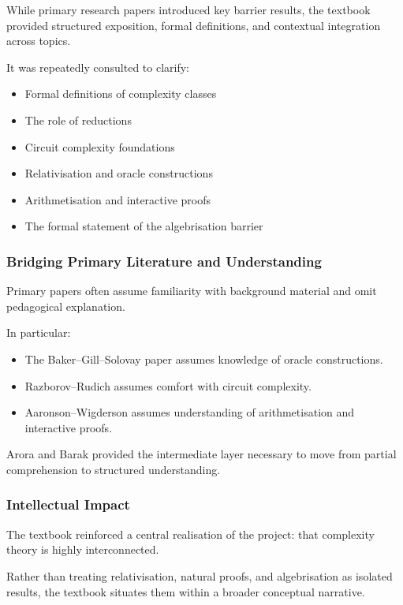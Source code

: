 \documentclass[12pt]{article}
\begin{document}
While primary research papers introduced key barrier results, the textbook provided structured exposition, formal definitions, and contextual integration across topics.

It was repeatedly consulted to clarify:

\begin{itemize}
\item Formal definitions of complexity classes
\item The role of reductions
\item Circuit complexity foundations
\item Relativisation and oracle constructions
\item Arithmetisation and interactive proofs
\item The formal statement of the algebrisation barrier
\end{itemize}

\subsubsection*{Bridging Primary Literature and Understanding}

Primary papers often assume familiarity with background material and omit pedagogical explanation.

In particular:

\begin{itemize}
\item The Baker–Gill–Solovay paper assumes knowledge of oracle constructions.
\item Razborov–Rudich assumes comfort with circuit complexity.
\item Aaronson–Wigderson assumes understanding of arithmetisation and interactive proofs.
\end{itemize}

Arora and Barak provided the intermediate layer necessary to move from partial comprehension to structured understanding.

\subsubsection*{Intellectual Impact}

The textbook reinforced a central realisation of the project: that complexity theory is highly interconnected.

Rather than treating relativisation, natural proofs, and algebrisation as isolated results, the textbook situates them within a broader conceptual narrative.
\end{document}

